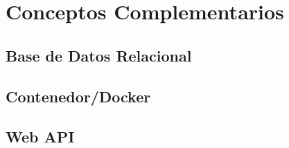 \section{Conceptos Complementarios}\label{sec:CAP2_Extra}

\subsection{Base de Datos Relacional}

\subsection{Contenedor/Docker}

\subsection{Web API}